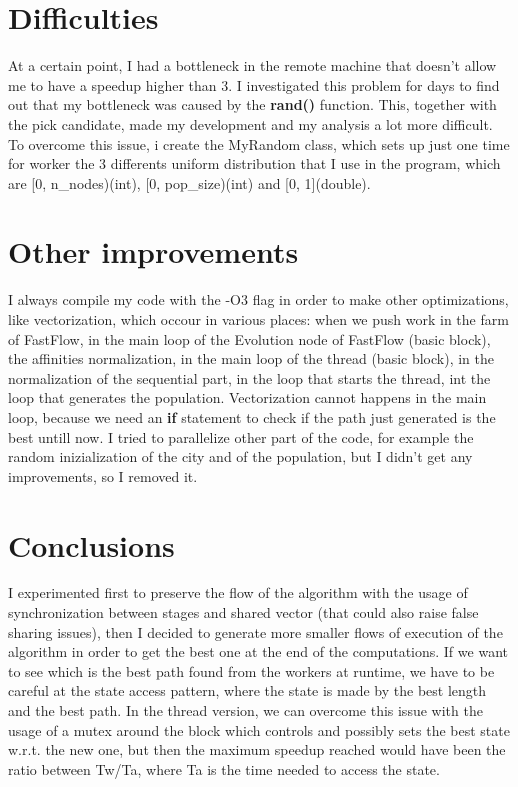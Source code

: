 \documentclass{article}
\begin{document}
    \section{Difficulties}
	At a certain point, I had a bottleneck in the remote machine that doesn't allow me to have a speedup higher than 3. I investigated this problem for days to find out that my bottleneck was caused by the \textbf{rand()} function. This, together with the pick candidate, made my development and my analysis a lot more difficult. To overcome this issue, i create the MyRandom class, which sets up just one time for worker the 3 differents uniform distribution that I use in the program, which are [0, n\_nodes)(int), [0, pop\_size)(int) and [0, 1](double).

    \section{Other improvements}
	I always compile my code with the -O3 flag in order to make other optimizations, like vectorization, which occour in various places: when we push work in the farm of FastFlow, in the main loop of the Evolution node of FastFlow (basic block), the affinities normalization, in the main loop of the thread (basic block), in the normalization of the sequential part, in the loop that starts the thread, int the loop that generates the population. Vectorization cannot happens in the main loop, because we need an \textbf{if} statement to check if the path just generated is the best untill now. I tried to parallelize other part of the code, for example the random inizialization of the city and of the population, but I didn't get any improvements, so I removed it.

    \section{Conclusions}
	I experimented first to preserve the flow of the algorithm with the usage of synchronization between stages and shared vector (that could also raise false sharing issues), then I decided to generate more smaller flows of execution of the algorithm in order to get the best one at the end of the computations. If we want to see which is the best path found from the workers at runtime, we have to be careful at the state access pattern, where the state is made by the best length and the best path. In the thread version, we can overcome this issue with the usage of a mutex around the block which controls and possibly sets the best state w.r.t. the new one, but then the maximum speedup reached would have been the ratio between Tw/Ta, where Ta is the time needed to access the state.
\end{document}
